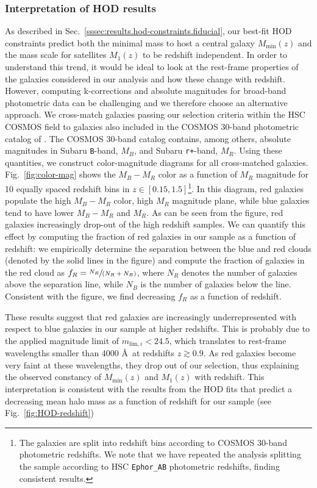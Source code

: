 \documentclass[a4paper,11pt]{article}
\begin{document}
\subsubsection{Interpretation of HOD results}\label{sssec:results.hod-constraints.constraints-interpretation}
As described in Sec.~\ref{sssec:results.hod-constraints.fiducial}, our best-fit HOD constraints predict both the minimal mass to host a central galaxy $M_{\mathrm{min}}(z)$ and the mass scale for satellites $M_{1}(z)$ to be redshift independent.
In order to understand this trend, it would be ideal to look at the rest-frame properties of the galaxies considered in our analysis and how these change with redshift. However, computing k-corrections and absolute magnitudes for broad-band photometric data can be challenging and we therefore choose an alternative approach. We cross-match galaxies passing our selection criteria within the HSC COSMOS field to galaxies also included in the COSMOS 30-band photometric catalog of \cite{2016ApJS..224...24L}. The COSMOS 30-band catalog contains, among others, absolute magnitudes in Subaru \texttt{B}-band, $M_{B}$, and Subaru \texttt{r+}-band, $M_{R}$. Using these quantities, we construct color-magnitude diagrams for all cross-matched galaxies. Fig.~\ref{fig:color-mag} shows the $M_{B}-M_{R}$ color as a function of $M_{R}$ magnitude for 10 equally spaced redshift bins in $z \in [0.15, 1.5]$\footnote{The galaxies are split into redshift bins according to COSMOS 30-band photometric redshifts. We note that we have repeated the analysis splitting the sample according to HSC \texttt{Ephor\_AB} photometric redshifts, finding consistent results.}. In this diagram, red galaxies populate the high $M_{B}-M_{R}$ color, high $M_{R}$ magnitude plane, while blue galaxies tend to have lower $M_{B}-M_{R}$ and $M_{R}$. As can be seen from the figure, red galaxies increasingly drop-out of the high redshift samples. We can quantify this effect by computing the fraction of red galaxies in our sample as a function of redshift: we empirically determine the separation between the blue and red clouds (denoted by the solid lines in the figure) and compute the fraction of galaxies in the red cloud as $f_{R} = \sfrac{N_{R}}{(N_{R}+N_{B})}$, where $N_{R}$ denotes the number of galaxies above the separation line, while $N_{B}$ is the number of galaxies below the line. Consistent with the figure, we find decreasing $f_{R}$ as a function of redshift. 

These results suggest that red galaxies are increasingly underrepresented with respect to blue galaxies in our sample at higher redshifts. This is probably due to the applied magnitude limit of $m_{\mathrm{lim}, i} < 24.5$, which translates to rest-frame wavelengths smaller than $4000$ \AA \, at redshifts $z \gtrsim 0.9$. As red galaxies become very faint at these wavelengths, they drop out of our selection, thus explaining the observed constancy of $M_{\mathrm{min}}(z)$ and $M_{1}(z)$ with redshift. This interpretation is consistent with the results from the HOD fits that predict a decreasing mean halo mass as a function of redshift for our sample (see Fig.~\ref{fig:HOD-redshift})
\end{document}
